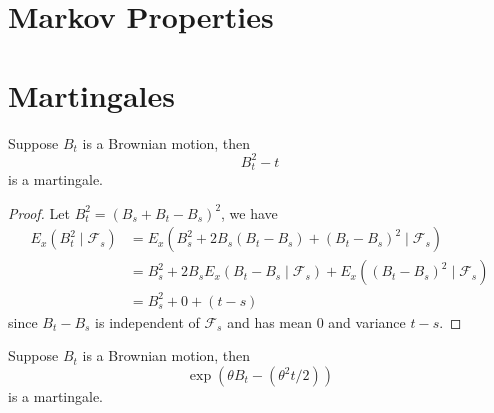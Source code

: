 \section{Markov Properties}

\section{Martingales}

\begin{example}
	Suppose $B_{t}$ is a Brownian motion, then $$B_{t}^{2}-t$$ is a martingale.
\end{example}

\begin{proof}
	Let $B_{t}^{2}=\left(B_{s}+B_{t}-B_{s}\right)^{2}$, we have
	\begin{equation*}
		\begin{aligned}
			E_{x}\left(B_{t}^{2}\mid\mathcal{F}_{s}\right) & =E_{x}\left(B_{s}^{2}+2 B_{s}\left(B_{t}-B_{s}\right)+\left(B_{t}-B_{s}\right)^{2} \mid \mathcal{F}_{s}\right)                            \\
			                                               & =B_{s}^{2}+2 B_{s} E_{x}\left(B_{t}-B_{s} \mid \mathcal{F}_{s}\right)+E_{x}\left(\left(B_{t}-B_{s}\right)^{2} \mid \mathcal{F}_{s}\right) \\
			                                               & =B_{s}^{2}+0+(t-s)
		\end{aligned}
	\end{equation*}
	since $B_{t}-B_{s}$ is independent of $\mathcal{F}_{s}$ and has mean 0 and variance $t-s$.
\end{proof}

\begin{example}
	Suppose $B_{t}$ is a Brownian motion, then $$\exp\left(\theta B_{t}-\left(\theta^{2}t/2\right)\right)$$ is a martingale.
\end{example}

